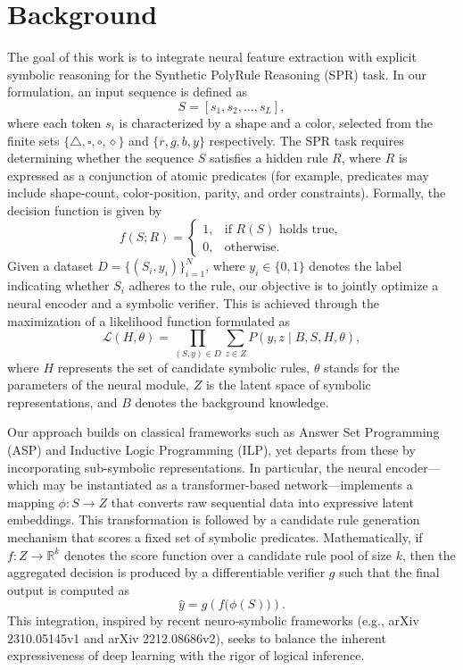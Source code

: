 \documentclass{article}
\begin{document}
\section{Background}
The goal of this work is to integrate neural feature extraction with explicit symbolic reasoning for the Synthetic PolyRule Reasoning (SPR) task. In our formulation, an input sequence is defined as 
\[
S = [s_1, s_2, \ldots, s_L],
\]
where each token \( s_i \) is characterized by a shape and a color, selected from the finite sets \(\{\triangle, \square, \circ, \diamond\}\) and \(\{r, g, b, y\}\) respectively. The SPR task requires determining whether the sequence \( S \) satisfies a hidden rule \( R \), where \( R \) is expressed as a conjunction of atomic predicates (for example, predicates may include shape-count, color-position, parity, and order constraints). Formally, the decision function is given by
\[
f(S; R) =
\begin{cases}
1, & \text{if } R(S) \text{ holds true}, \\
0, & \text{otherwise.}
\end{cases}
\]
Given a dataset \( D = \{(S_i, y_i)\}_{i=1}^N \), where \( y_i \in \{0,1\} \) denotes the label indicating whether \( S_i \) adheres to the rule, our objective is to jointly optimize a neural encoder and a symbolic verifier. This is achieved through the maximization of a likelihood function formulated as
\[
\mathcal{L}(H,\theta) = \prod_{(S,y)\in D}\sum_{z\in Z} P(y,z \mid B, S, H,\theta),
\]
where \( H \) represents the set of candidate symbolic rules, \( \theta \) stands for the parameters of the neural module, \( Z \) is the latent space of symbolic representations, and \( B \) denotes the background knowledge.

Our approach builds on classical frameworks such as Answer Set Programming (ASP) and Inductive Logic Programming (ILP), yet departs from these by incorporating sub-symbolic representations. In particular, the neural encoder—which may be instantiated as a transformer-based network—implements a mapping \(\phi: S \rightarrow Z\) that converts raw sequential data into expressive latent embeddings. This transformation is followed by a candidate rule generation mechanism that scores a fixed set of symbolic predicates. Mathematically, if \( f: Z \rightarrow \mathbb{R}^k \) denotes the score function over a candidate rule pool of size \( k \), then the aggregated decision is produced by a differentiable verifier \( g \) such that the final output is computed as 
\[
\hat{y} = g\left(f\big(\phi(S)\big)\right).
\]
This integration, inspired by recent neuro‐symbolic frameworks (e.g., arXiv 2310.05145v1 and arXiv 2212.08686v2), seeks to balance the inherent expressiveness of deep learning with the rigor of logical inference.
\end{document}
